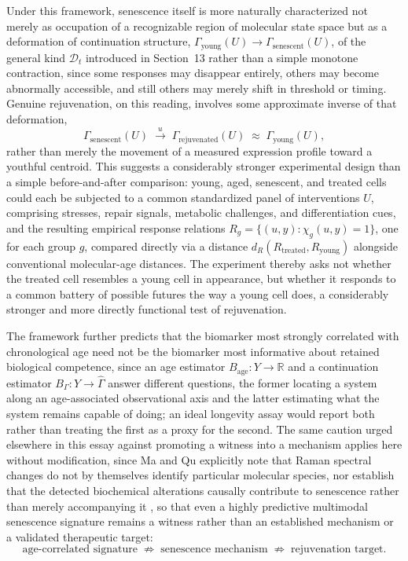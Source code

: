 \documentclass[11pt]{article}
\begin{document}
Under this framework, senescence itself is more naturally characterized not merely as occupation of a recognizable region of molecular state space but as a deformation of continuation structure, $\Gamma_{\text{young}}(U) \to \Gamma_{\text{senescent}}(U)$, of the general kind $\mathcal{D}_t$ introduced in Section~13 rather than a simple monotone contraction, since some responses may disappear entirely, others may become abnormally accessible, and still others may merely shift in threshold or timing. Genuine rejuvenation, on this reading, involves some approximate inverse of that deformation,
\begin{equation}
\Gamma_{\text{senescent}}(U) \;\xrightarrow{\ u\ }\; \Gamma_{\text{rejuvenated}}(U) \;\approx\; \Gamma_{\text{young}}(U),
\end{equation}
rather than merely the movement of a measured expression profile toward a youthful centroid. This suggests a considerably stronger experimental design than a simple before-and-after comparison: young, aged, senescent, and treated cells could each be subjected to a common standardized panel of interventions $U$, comprising stresses, repair signals, metabolic challenges, and differentiation cues, and the resulting empirical response relations $R_g = \{(u,y) : \chi_g(u,y) = 1\}$, one for each group $g$, compared directly via a distance $d_R(R_{\text{treated}}, R_{\text{young}})$ alongside conventional molecular-age distances. The experiment thereby asks not whether the treated cell resembles a young cell in appearance, but whether it responds to a common battery of possible futures the way a young cell does, a considerably stronger and more directly functional test of rejuvenation.

The framework further predicts that the biomarker most strongly correlated with chronological age need not be the biomarker most informative about retained biological competence, since an age estimator $B_{\text{age}} : Y \to \mathbb{R}$ and a continuation estimator $B_\Gamma : Y \to \widehat{\Gamma}$ answer different questions, the former locating a system along an age-associated observational axis and the latter estimating what the system remains capable of doing; an ideal longevity assay would report both rather than treating the first as a proxy for the second. The same caution urged elsewhere in this essay against promoting a witness into a mechanism applies here without modification, since Ma and Qu explicitly note that Raman spectral changes do not by themselves identify particular molecular species, nor establish that the detected biochemical alterations causally contribute to senescence rather than merely accompanying it \cite{maqu2026}, so that even a highly predictive multimodal senescence signature remains a witness rather than an established mechanism or a validated therapeutic target:
\begin{equation}
\text{age-correlated signature} \;\not\Longrightarrow\; \text{senescence mechanism} \;\not\Longrightarrow\; \text{rejuvenation target}.
\end{equation}
\end{document}
